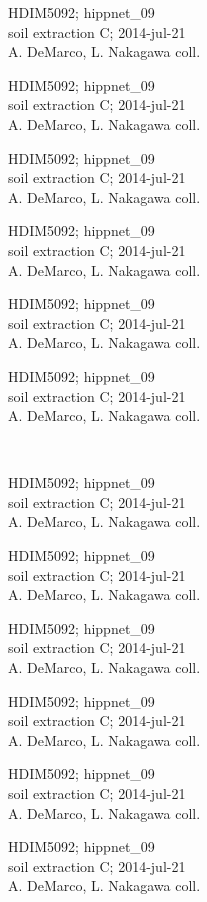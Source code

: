 \documentclass[2pt]{extarticle}
\begin{document}
\noindent
\parbox{0.16\textwidth}{\tiny \raggedright \rule[-0.3\baselineskip]{0pt}{10pt}HDIM5092; hippnet\_09\\ soil extraction C; 2014-jul-21\\ A. DeMarco, L. Nakagawa coll.}
\parbox{0.16\textwidth}{\tiny \raggedright \rule[-0.3\baselineskip]{0pt}{10pt}HDIM5092; hippnet\_09\\ soil extraction C; 2014-jul-21\\ A. DeMarco, L. Nakagawa coll.}
\parbox{0.16\textwidth}{\tiny \raggedright \rule[-0.3\baselineskip]{0pt}{10pt}HDIM5092; hippnet\_09\\ soil extraction C; 2014-jul-21\\ A. DeMarco, L. Nakagawa coll.}
\parbox{0.16\textwidth}{\tiny \raggedright \rule[-0.3\baselineskip]{0pt}{10pt}HDIM5092; hippnet\_09\\ soil extraction C; 2014-jul-21\\ A. DeMarco, L. Nakagawa coll.}
\parbox{0.16\textwidth}{\tiny \raggedright \rule[-0.3\baselineskip]{0pt}{10pt}HDIM5092; hippnet\_09\\ soil extraction C; 2014-jul-21\\ A. DeMarco, L. Nakagawa coll.}
\parbox{0.16\textwidth}{\tiny \raggedright \rule[-0.3\baselineskip]{0pt}{10pt}HDIM5092; hippnet\_09\\ soil extraction C; 2014-jul-21\\ A. DeMarco, L. Nakagawa coll.} \\ 
\vspace{0.001in} 

\noindent
\parbox{0.16\textwidth}{\tiny \raggedright \rule[-0.3\baselineskip]{0pt}{10pt}HDIM5092; hippnet\_09\\ soil extraction C; 2014-jul-21\\ A. DeMarco, L. Nakagawa coll.}
\parbox{0.16\textwidth}{\tiny \raggedright \rule[-0.3\baselineskip]{0pt}{10pt}HDIM5092; hippnet\_09\\ soil extraction C; 2014-jul-21\\ A. DeMarco, L. Nakagawa coll.}
\parbox{0.16\textwidth}{\tiny \raggedright \rule[-0.3\baselineskip]{0pt}{10pt}HDIM5092; hippnet\_09\\ soil extraction C; 2014-jul-21\\ A. DeMarco, L. Nakagawa coll.}
\parbox{0.16\textwidth}{\tiny \raggedright \rule[-0.3\baselineskip]{0pt}{10pt}HDIM5092; hippnet\_09\\ soil extraction C; 2014-jul-21\\ A. DeMarco, L. Nakagawa coll.}
\parbox{0.16\textwidth}{\tiny \raggedright \rule[-0.3\baselineskip]{0pt}{10pt}HDIM5092; hippnet\_09\\ soil extraction C; 2014-jul-21\\ A. DeMarco, L. Nakagawa coll.}
\parbox{0.16\textwidth}{\tiny \raggedright \rule[-0.3\baselineskip]{0pt}{10pt}HDIM5092; hippnet\_09\\ soil extraction C; 2014-jul-21\\ A. DeMarco, L. Nakagawa coll.} \\ 
\vspace{0.001in} 
\end{document}
